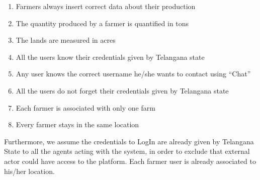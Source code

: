 \begin{enumerate}[label=\textbf{DA.\arabic*}]
    \item Farmers always insert correct data about their production
    \item The quantity produced by a farmer is quantified in tons
    \item The lands are measured in acres
    \item All the users know their credentials given by Telangana state
    \item Any user knows the correct username he/she wants to contact using “Chat”
    \item All the users do not forget their credentials given by Telangana state
    \item Each farmer is associated with only one farm
    \item Every farmer stays in the same location\\
\end{enumerate}
Furthermore, we assume the credentials to LogIn are already given by Telangana State to all the agents acting with the system, in order to exclude that external actor could have access to the platform. Each farmer user is already associated to his/her location.